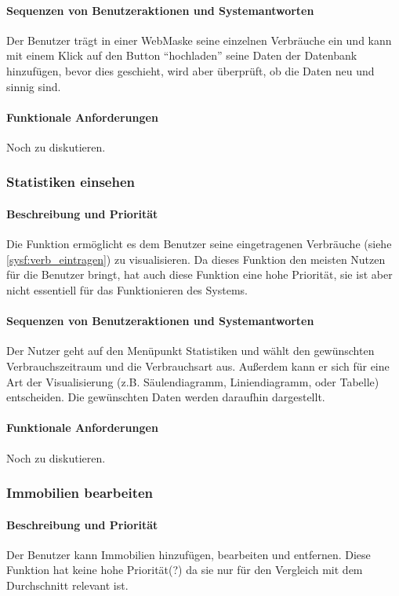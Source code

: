\paragraph{Sequenzen von Benutzeraktionen und Systemantworten}
Der Benutzer trägt in einer WebMaske seine einzelnen Verbräuche ein und kann mit einem Klick auf den Button “hochladen” seine Daten der Datenbank hinzufügen, bevor dies geschieht, wird aber überprüft, ob die Daten neu und sinnig sind.
\paragraph{Funktionale Anforderungen}
Noch zu diskutieren.

\subsubsection{Statistiken einsehen}
\paragraph{Beschreibung und Priorität}
Die Funktion ermöglicht es dem Benutzer seine eingetragenen Verbräuche (siehe \ref{sysf:verb_eintragen}) zu visualisieren. Da dieses Funktion den meisten Nutzen für die Benutzer bringt, hat auch diese Funktion eine hohe Priorität, sie ist aber nicht essentiell für das Funktionieren des Systems.

\paragraph{Sequenzen von Benutzeraktionen und Systemantworten}

Der Nutzer geht auf den Menüpunkt Statistiken und wählt den gewünschten Verbrauchszeitraum und die Verbrauchsart aus. Außerdem kann er sich für eine Art der Visualisierung (z.B. Säulendiagramm, Liniendiagramm, oder Tabelle) entscheiden. Die gewünschten Daten werden daraufhin dargestellt.

\paragraph{Funktionale Anforderungen}
Noch zu diskutieren.

\subsubsection{Immobilien bearbeiten}
\paragraph{Beschreibung und Priorität}
Der Benutzer kann Immobilien hinzufügen,
bearbeiten und entfernen. %
Diese Funktion hat keine hohe Priorität(?) da sie nur für den Vergleich mit dem Durchschnitt relevant ist.
